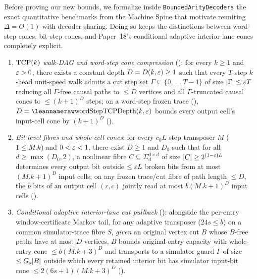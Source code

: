 Before proving our new bounds, we formalize inside \texttt{BoundedArityDecoders} the exact
quantitative benchmarks from the Machine Spine that motivate reuniting $\Delta = O(1)$ with
decoder sharing. Doing so keeps the distinctions between word-step cones, bit-step cones, and
Paper~18's conditional adaptive interior-lane cones completely explicit.

\begin{proposition}\label{prop:diag-cones}
\begin{enumerate}[label=(\alph*)]
\item \emph{$\mathrm{TCP}(k)$ walk-DAG and word-step cone compression}
  (\cite[Proposition~2.4 and Theorem~7.5]{BoundedStack2026}): for every $k \ge 1$ and $\varepsilon > 0$,
  there exists a constant depth $D = D(k,\varepsilon) \ge 1$ such that every $T$-step $k$-head unit-speed
  walk admits a cut step set $\Gamma \subseteq \{0,\dots,T-1\}$ of size $\lvert \Gamma \rvert \le \varepsilon T$
  reducing all $\Gamma$-free causal paths to $\le D$ vertices and all $\Gamma$-truncated causal
  cones to $\le (k+1)^D$ steps; on a word-step frozen trace (),
  $D = \lean{wordStepTCPDepth}(k,\eps)$ bounds every output cell's input-cell cone by $(k+1)^D$
  ().
\item \emph{Bit-level  fibres and whole-cell cones}: for every $c_0 L$-step
  transposer $M$ ($1 \le M.k$) and $0 < \varepsilon < 1$, there exist $D \ge 1$ and $D_0$ such that for all
  $d \ge \max(D_0, 2)$, a nonlinear fibre $C \subseteq \Sigma_d^{d\times d}$ of size
  $\lvert C \rvert \ge 2^{(1-\varepsilon)L}$ determines every output bit outside $\le \varepsilon L$ broken bits from at
  most $(M.k+1)^D$ input cells; on any frozen trace/cut fibre of path length $\le D$, the $b$ bits
  of an output cell $(r,c)$ jointly read at most $b(M.k+1)^D$ input cells
  ().
\item \emph{Conditional adaptive interior-lane cut pullback}
  (\cite[Lemma~H.2, Theorem~H.5, and Corollary~H.6]{AdaptiveTransfer2026}): alongside the per-entry
  window-certificate Markov tail, for any adaptive transposer ($24 s \le b$) on a common
  simulator-trace fibre $S$, \emph{given} an original vertex cut $B$ whose $B$-free paths have at
  most $D$ vertices, $B$ bounds original-entry capacity with whole-entry cone $\le b(M.k+3)^D$ and
  transports to a simulator guard $\Gamma$ of size $\le G_s\lvert B \rvert$ outside which every retained
  interior bit has simulator input-bit cone $\le 2(6s+1)(M.k+3)^D$
  ().
\end{enumerate}
\end{proposition}
